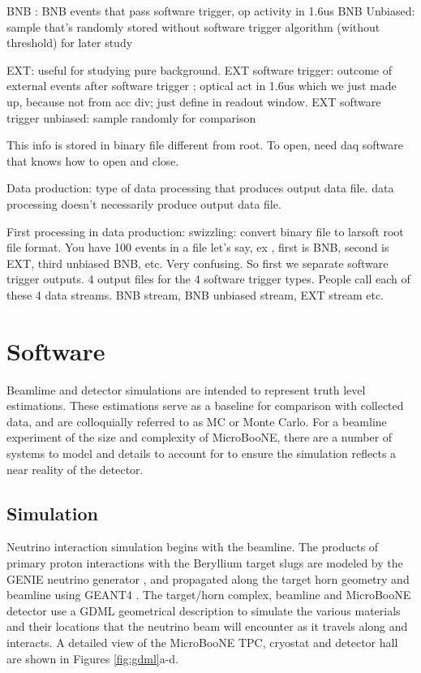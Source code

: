 \documentclass[12pt]{article}
\begin{document}
BNB : BNB events that pass software trigger, op activity in 1.6us
BNB Unbiased: sample that's randomly stored without software trigger algorithm (without threshold) for later study

EXT: useful for studying pure background.  {
  EXT software trigger: outcome of external events after software trigger ; optical act in 1.6us which we just made up, because not from acc div; just define in readout window.
    EXT software trigger unbiased: sample randomly for comparison
    }

    This info is stored in binary file different from root. To open, need daq software that knows how to open and close. 

    Data production: type of data processing that produces output data file. data processing doesn't necessarily produce output data file.   

    First processing in data production: swizzling: convert binary file to larsoft root file format.  You have 100 events in a file let's say, ex , first is BNB, second is EXT, third unbiased BNB, etc.  Very confusing.  So first we separate software trigger outputs.  4 output files for the 4 software trigger types.  People call each of these 4 data streams.  BNB stream, BNB unbiased stream, EXT stream etc.  


\clearpage

\newpage
\section{Software} \label{sec:software}
Beamlime and detector simulations are intended to represent truth level estimations. These estimations serve as a baseline for comparison with collected data, and are colloquially referred to as MC or Monte Carlo.  For a beamline experiment of the size and complexity of MicroBooNE, there are a number of systems to model and details to account for to ensure the simulation reflects a near reality of the detector. 

\subsection{Simulation}
Neutrino interaction simulation begins with the beamline.  The products of primary proton interactions with the Beryllium target slugs are modeled by the GENIE neutrino generator \cite{bib:genie}, and propagated along the target horn geometry and beamline using GEANT4 \cite{bib:geant4}.  The target/horn complex, beamline and MicroBooNE detector use a GDML geometrical description \cite{bib:gdml} to simulate the various materials and their locations that the neutrino beam will encounter as it travels along and interacts. A detailed view of the MicroBooNE TPC, cryostat and detector hall are shown in Figures \ref{fig:gdml}a-d.
\par 
\end{document}

